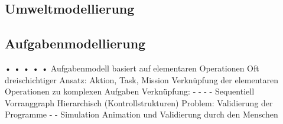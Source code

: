 \subsection{Umweltmodellierung}
\subsection{Aufgabenmodellierung}
•
•
•
•
•
Aufgabenmodell basiert auf elementaren Operationen
Oft dreischichtiger Ansatz: Aktion, Task, Mission
Verknüpfung der elementaren Operationen zu komplexen Aufgaben
Verknüpfung:
-
-
-
-
Sequentiell
Vorranggraph
Hierarchisch
(Kontrollstrukturen)
Problem: Validierung der Programme
-
-
Simulation
Animation und Validierung durch den Menschen